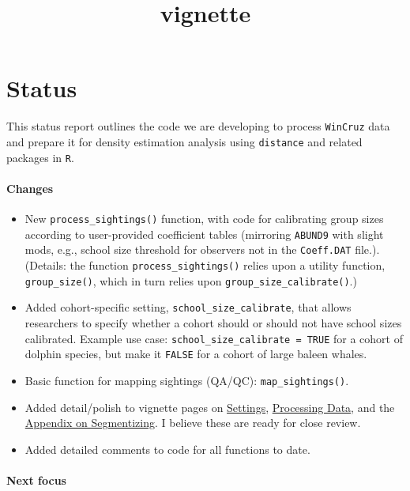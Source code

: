 \documentclass[
]{book}
\title{vignette}
\author{}
\date{\vspace{-2.5em}}
\begin{document}
\maketitle

{
\setcounter{tocdepth}{1}
\tableofcontents
}
\hypertarget{status}{%
\chapter{Status}\label{status}}

This status report outlines the code we are developing to process \texttt{WinCruz} data and prepare it for density estimation analysis using \texttt{distance} and related packages in \texttt{R}.

\hypertarget{changes}{%
\subsubsection*{Changes}\label{changes}}

\begin{itemize}
\item
  New \texttt{process\_sightings()} function, with code for calibrating group sizes according to user-provided coefficient tables (mirroring \texttt{ABUND9} with slight mods, e.g., school size threshold for observers not in the \texttt{Coeff.DAT} file.). (Details: the function \texttt{process\_sightings()} relies upon a utility function, \texttt{group\_size()}, which in turn relies upon \texttt{group\_size\_calibrate()}.)
\item
  Added cohort-specific setting, \texttt{school\_size\_calibrate}, that allows researchers to specify whether a cohort should or should not have school sizes calibrated. Example use case: \texttt{school\_size\_calibrate\ =\ TRUE} for a cohort of dolphin species, but make it \texttt{FALSE} for a cohort of large baleen whales.
\item
  Basic function for mapping sightings (QA/QC): \texttt{map\_sightings()}.
\item
  Added detail/polish to vignette pages on \protect\hyperlink{settings}{Settings}, \protect\hyperlink{processing}{Processing Data}, and the \protect\hyperlink{segmentizing}{Appendix on Segmentizing}. I believe these are ready for close review.
\item
  Added detailed comments to code for all functions to date.
\end{itemize}

\hypertarget{next-focus}{%
\subsubsection*{Next focus}\label{next-focus}}
\end{document}
